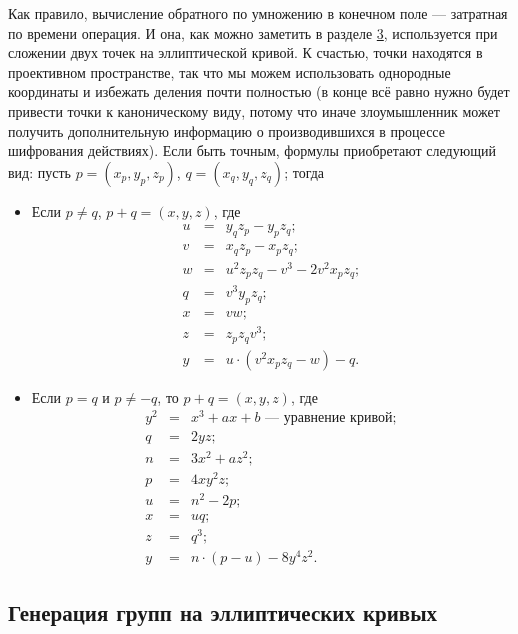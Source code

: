 \documentclass[a4paper,14pt]{extarticle}
\begin{document}
Как правило, вычисление обратного по умножению в конечном поле --- затратная по
времени операция. И она, как можно заметить в разделе \hyperref[elliptic]{3},
используется при сложении двух точек на эллиптической кривой. К счастью, точки
находятся в проективном пространстве, так что мы можем использовать однородные
координаты и
избежать деления почти полностью (в конце всё равно нужно будет привести точки к
каноническому виду, потому что иначе злоумышленник может получить дополнительную
информацию о производившихся в процессе шифрования действиях). Если быть точным,
формулы приобретают следующий вид: пусть $p = (x_p, y_p, z_p)$,
$q = (x_q, y_q, z_q)$; тогда

\begin{itemize}
    \item Если $p \ne q$, $p + q = (x, y, z)$, где
        \[
            \begin{array}{rcl}
                u &=& y_q z_p - y_p z_q; \\
                v &=& x_q z_p - x_p z_q; \\
                w &=& u^2 z_p z_q - v^3 - 2 v^2 x_p z_q; \\
                q &=& v^3 y_p z_q; \\
                x &=& v w; \\
                z &=& z_p z_q v^3; \\
                y &=& u \cdot (v^2 x_p z_q - w) - q.
            \end{array}
        \]
    \item Если $p = q$ и $p \ne -q$, то $p + q = (x, y, z)$, где
        \[
            \begin{array}{rcl}
                y^2 &=& x^3 + a x + b \text{ --- уравнение кривой}; \\
                q &=& 2 y z; \\
                n &=& 3 x^2 + a z^2; \\
                p &=& 4 x y^2 z; \\
                u &=& n^2 - 2 p; \\

                x &=& u q; \\
                z &=& q^3; \\
                y &=& n \cdot (p - u) - 8 y^4 z^2.
            \end{array}
        \]
\end{itemize}

\subsection{Генерация групп на эллиптических кривых}
\label{generator}
\end{document}

